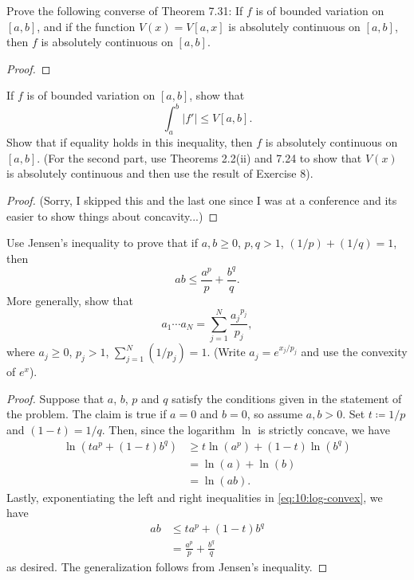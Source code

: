 \begin{problem}
Prove the following converse of Theorem 7.31: If $f$ is of bounded
variation on $[a,b]$, and if the function $V(x)=V[a,x]$ is absolutely
continuous on $[a,b]$, then $f$ is absolutely continuous on $[a,b]$.
\end{problem}
\begin{proof}

\end{proof}
\newpage

\begin{problem}
If $f$ is of bounded variation on $[a,b]$, show that
\[
\int_a^b|f'|\leq V[a,b].
\]
Show that if equality holds in this inequality, then $f$ is absolutely
continuous on $[a,b]$. (For the second part, use Theorems 2.2(ii) and 7.24
to show that $V(x)$ is absolutely continuous and then use the result of
Exercise 8).
\end{problem}
\begin{proof}
(Sorry, I skipped this and the last one since I was at a conference and its
easier to show things about concavity...)
\end{proof}
\newpage

\begin{problem}
Use Jensen's inequality to prove that if $a,b\geq 0$, $p,q>1$,
$(1/p)+(1/q)=1$, then
\[
ab\leq\frac{a^p}{p}+\frac{b^q}{q}.
\]
More generally, show that
\[
a_1\dotsm a_N=\sum_{j=1}^N\frac{{a_j}^{p_j}}{p_j},
\]
where $a_j\geq 0$, $p_j>1$, $\sum_{j=1}^N(1/p_j)=1$. (Write
$a_j=e^{x_j/p_j}$ and use the convexity of $e^x$).
\end{problem}
\begin{proof}
Suppose that $a$, $b$, $p$ and $q$ satisfy the conditions given in the
statement of the problem. The claim is true if $a=0$ and $b=0$, so assume
$a,b>0$. Set $t\coloneqq 1/p$ and $(1-t)=1/q$. Then, since the logarithm
$\ln$ is strictly concave, we have
\begin{equation}
\label{eq:10:log-convex}
\begin{aligned}
\ln(ta^p+(1-t)b^q)
&\geq t\ln(a^p)+(1-t)\ln(b^q)\\
&=\ln(a)+\ln(b)\\
&=\ln(ab).
\end{aligned}
\end{equation}
Lastly, exponentiating the left and right inequalities in
\eqref{eq:10:log-convex}, we have
\begin{equation}
\label{eq:10:exp-ineq}
\begin{aligned}
ab&\leq ta^p+(1-t)b^q\\
&=\frac{a^p}{p}+\frac{b^q}{q}
\end{aligned}
\end{equation}
as desired. The generalization follows from Jensen's inequality.
\end{proof}
\newpage

